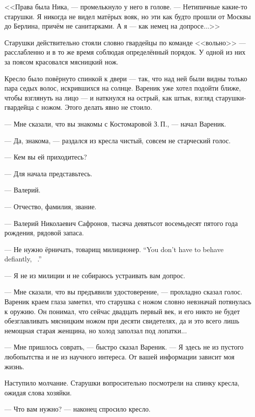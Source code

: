 \asterism

\textspace

<<Права была Ника, --- промелькнуло у него в голове.
--- Нетипичные какие-то старушки.
Я никогда не видел матёрых вояк, но эти как будто прошли от Москвы до Берлина, причём не санитарками.
А я --- как немец на допросе...>>

Старушки действительно стояли словно гвардейцы по команде <<вольно>> --- расслабленно и в то же время соблюдая определённый порядок.
У одной из них за поясом красовался мясницкий нож.

Кресло было повёрнуто спинкой к двери --- так, что над ней были видны только пара седых волос, искрившихся на солнце.
Вареник уже хотел подойти ближе, чтобы взглянуть на лицо --- и наткнулся на острый, как штык, взгляд старушки-гвардейца с ножом.
Этого делать явно не стоило.

--- Мне сказали, что вы знакомы с Костомаровой З.\,П., --- начал Вареник.

--- Да, знакома, --- раздался из кресла чистый, совсем не старческий голос.

--- Кем вы ей приходитесь?

--- Для начала представьтесь.

--- Валерий.

--- Отчество, фамилия, звание.

--- Валерий Николаевич Сафронов, тысяча девятьсот восемьдесят пятого года рождения, рядовой запаса.

{--- Не нужно ёрничать, товарищ милиционер.}
{``You don't have to behave defiantly, \tovarisch\ \militsioner.''}

--- Я не из милиции и не собираюсь устраивать вам допрос.

--- Мне сказали, что вы предъявили удостоверение, --- прохладно сказал голос.
Вареник краем глаза заметил, что старушка с ножом словно невзначай потянулась к оружию.
Он понимал, что сейчас двадцать первый век, и его никто не будет обезглавливать мясницким ножом при десяти свидетелях, да и это всего лишь немощная старая женщина, но холод заползал под лопатки...

--- Мне пришлось соврать, --- быстро сказал Вареник.
--- Я здесь не из пустого любопытства и не из научного интереса.
От вашей информации зависит моя жизнь.

Наступило молчание.
Старушки вопросительно посмотрели на спинку кресла, ожидая слова хозяйки.

--- Что вам нужно? --- наконец спросило кресло.

